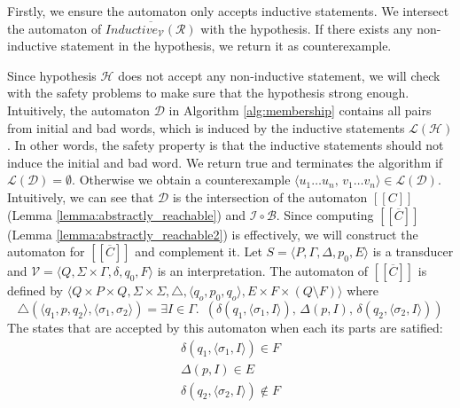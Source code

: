 Firstly, we ensure the automaton only accepts 
inductive statements. 
We intersect the automaton of $\overline{Inductive_{\mathcal{V}}(\mathcal{R})}$ with the hypothesis.
If there exists any non-inductive statement in the hypothesis,
we return it as counterexample.

Since hypothesis $\mathcal{H}$ does not accept any 
non-inductive statement, we will check with the safety problems
to make sure that the hypothesis strong enough.
Intuitively, the automaton $\mathcal{D}$ in Algorithm \ref*{alg:membership} contains all pairs from initial and bad words,
which is induced by the inductive statements $\mathcal{L}(\mathcal{H})$.
In other words, the safety property is that the inductive statements should not induce the
initial and bad word. We return true and terminates the algorithm if $\mathcal{L}(\mathcal{D}) = \emptyset$.
Otherwise we obtain a counterexample 
$\langle u_1 \dots u_n, \, v_1 \dots v_n \rangle \in \mathcal{L}(\mathcal{D})$.
Intuitively, we can see that $\mathcal{D}$ is the intersection of
the automaton $[[C]]$ (Lemma \ref{lemma:abstractly_reachable}) and $\mathcal{I} \circ  \mathcal{B}$.
Since computing $[[\overline{C}]]$ (Lemma \ref{lemma:abstractly_reachable2}) is effectively, we will construct the automaton for $[[\overline{C}]]$ and complement it.
Let $S =  \langle P, \Gamma, \Delta, p_0, E \rangle$ 
is a transducer and  $\mathcal{V} =  \langle Q, \Sigma \times \Gamma, \delta, q_0, F \rangle$ is 
an interpretation. The automaton of $[[\overline{C}]]$ 
is defined by $\langle Q \times P \times Q, \Sigma \times \Sigma, \triangle, \langle q_o,  p_0, q_o \rangle, 
E \times F \times (Q \setminus F) \rangle$ where
\begin{equation*}
    \triangle(\langle q_1, p, q_2 \rangle, \langle \sigma_1, \sigma_2 \rangle) =  \exists I \in \Gamma. \,\,\,
    (\delta(q_1, \langle \sigma_1, I \rangle) ,\, \Delta(p, I) ,\, \delta(q_2, \langle \sigma_2, I \rangle))
\end{equation*}
The states that are accepted by this automaton when each its parts are satified: 
\begin{align*} 
    \delta(q_1, \langle \sigma_1, I \rangle) \in  F \\
    \Delta(p, I) \in E \\
    \delta(q_2, \langle \sigma_2, I \rangle) \notin  F
\end{align*}

